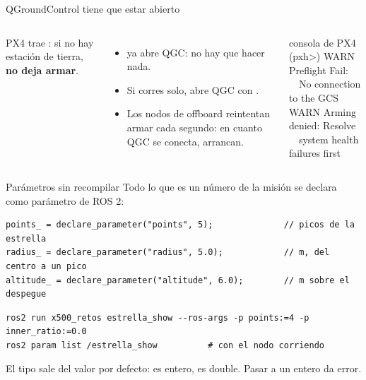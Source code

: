 \begin{frame}{QGroundControl tiene que estar abierto}
  \begin{columns}[c]
    \small
    PX4 trae : si no hay estación de tierra, \textbf{no deja armar}.
    \begin{itemize}
      \item {} ya abre QGC: no hay que hacer nada.
      \item Si corres  solo, abre QGC con .
      \item Los nodos de offboard reintentan armar cada segundo: en cuanto QGC se conecta, arrancan.
    \end{itemize}
    \begin{terminal}{consola de PX4 (pxh>)}
WARN Preflight Fail:\\
\ \ No connection to the GCS\\
WARN Arming denied: Resolve\\
\ \ system health failures first
    \end{terminal}
  \end{columns}
\end{frame}

\begin{frame}[fragile]{Parámetros sin recompilar}
  \small Todo lo que es un número de la misión se declara como parámetro de ROS 2:
  \begin{lstlisting}[style=cpp,caption={Así se declaran (estrella\_show)}]
points_ = declare_parameter("points", 5);              // picos de la estrella
radius_ = declare_parameter("radius", 5.0);            // m, del centro a un pico
altitude_ = declare_parameter("altitude", 6.0);        // m sobre el despegue
  \end{lstlisting}
  \begin{lstlisting}[style=bash,caption={Y así se cambian}]
ros2 run x500_retos estrella_show --ros-args -p points:=4 -p inner_ratio:=0.0
ros2 param list /estrella_show          # con el nodo corriendo
  \end{lstlisting}
  \footnotesize El tipo sale del valor por defecto:  es entero,  es double.
  Pasar  a un entero da error.
\end{frame}

